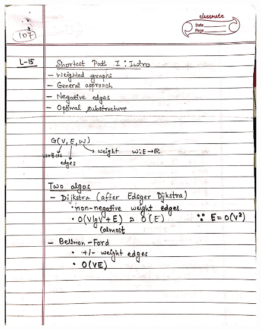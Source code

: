 \newpage
\begin{figure}[H]
    \centering
    \includegraphics[scale=0.25]{"./MIT 6.006/MIT_6006_107"}
\end{figure}
\newpage
